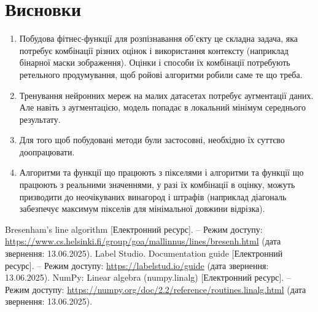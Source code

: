 \documentclass[a4paper,14pt]{report}
\begin{document}
\chapter{Висновки}
\begin{enumerate}
  \item Побудова фітнес-функції для розпізнавання об'єкту це складна задача, яка потребує комбінації різних оцінок і використання контексту (наприклад бінарної маски зображення). Оцінки і способи їх комбінації потребують ретельного продумування, щоб ройові алгоритми робили саме те що треба.
  \item Тренування нейронних мереж на малих датасетах потребує аугментації даних. Але навіть з аугментацією, модель попадає в локальний мінімум середнього результату.
  \item Для того щоб побудовані методи були застосовні, необхідно їх суттєво доопрацювати.
  \item Алгоритми та функції що працюють з пікселями і алгоритми та функції що працюють з реальними значеннями, у разі їх комбінації в оцінку, можуть призводити до неочікуваних винагород і штрафів (наприклад діагональ забезпечує максимум пікселів для мінімальної довжини відрізка).
\end{enumerate}

\begin{thebibliography}{9}
Bresenham's line algorithm [Електронний ресурс]. – Режим доступу: \url{https://www.cs.helsinki.fi/group/goa/mallinnus/lines/bresenh.html} (дата звернення: 13.06.2025).
Label Studio. Documentation guide [Електронний ресурс]. – Режим доступу: \url{https://labelstud.io/guide} (дата звернення: 13.06.2025).
NumPy: Linear algebra (numpy.linalg) [Електронний ресурс]. – Режим доступу: \url{https://numpy.org/doc/2.2/reference/routines.linalg.html} (дата звернення: 13.06.2025).
\end{thebibliography}
\end{document}
